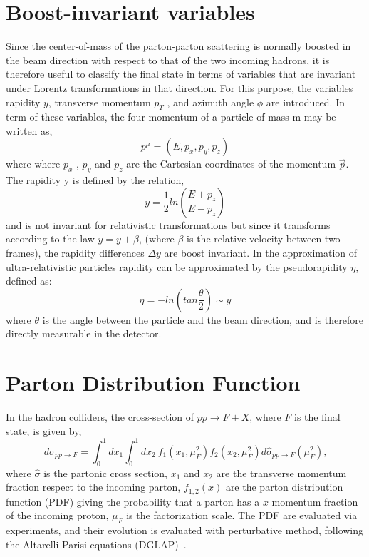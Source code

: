 \documentclass[PhD,binding=0.6cm]{../sapthesis}
\begin{document}
\appendix

\chapter{Boost-invariant variables}
\label{psr}
Since the center-of-mass of the parton-parton scattering is normally boosted in the beam
direction with respect to that of the two incoming hadrons, it is therefore useful to classify
the final state in terms of variables that are invariant under Lorentz transformations in
that direction. For this purpose, the variables rapidity $y$, transverse momentum $p_T$ , and
azimuth angle $\phi$ are introduced. In term of these variables, the four-momentum of a
particle of mass m may be written as,
\begin{equation}
p^{\mu}=(E,p_x,p_y,p_z)
\end{equation}
where where $p_x$ , $p_y$ and $p_z$ are the Cartesian coordinates of the momentum $\vec{p}$. 
The rapidity y is defined by the relation,
\begin{equation}
y=\frac{1}{2} ln (\frac{E+p_z}{E-p_z})
\end{equation}
and is not invariant for relativistic transformations but since it transforms according to
the law $y = y + \beta$, (where $\beta$ is the relative velocity between two frames), the rapidity
differences $\Delta y$ are boost invariant. In the approximation of ultra-relativistic particles rapidity can be approximated by the pseudorapidity $\eta$, defined as:
\begin{equation}
\eta=- ln (tan \frac{\theta}{2}) \sim y
\end{equation}
where $\theta$ is the angle between the particle and the beam direction, and
is therefore directly measurable in the detector.

\chapter{Parton Distribution Function}
\label{pdfa}
In  the hadron colliders, the cross-section of $pp \to F+X $, where $F$ is the final state, is given by,
\begin{equation}
d \sigma_{pp \rightarrow F} = \int_0 ^1 dx_1 \int_0 ^1 d x_2 \: f_1(x_1, \mu_F^2) f_2(x_2, \mu_F^2) d \hat{\sigma}_{pp \rightarrow F}(\mu_F ^2)  \mbox{,}\end{equation}
where  $\hat{\sigma}$ is the partonic cross section, $x_1$ and  $x_2$ are the transverse momentum fraction respect to the incoming parton,  $f_{1,2}(x)$ are the 
parton distribution function (PDF) giving the probability that a parton has a $x$ momentum fraction of the incoming proton,  $\mu_F$ is the factorization scale.
The PDF are evaluated via experiments, and their evolution is evaluated with perturbative method, following the Altarelli-Parisi equations (DGLAP)~\cite{Altarelli:1977zs}.


\end{document}
